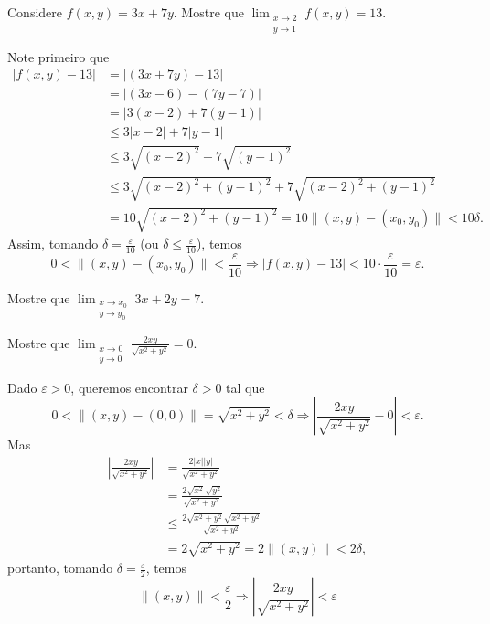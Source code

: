 \begin{example}
    Considere \(f(x,y) = 3x + 7y\). Mostre que \(\displaystyle\lim_{\substack{x\to 2 \\ y\to 1}} f(x,y) = 13.\)

    Note primeiro que
        \begin{align*}
            |f(x,y) - 13|
                & = |(3x+7y) - 13| \\
                & = |(3x - 6) - (7y - 7)| \\
                & = |3(x-2) + 7(y-1)| \\
                & \leq 3|x-2| + 7|y-1| \\
                & \leq 3\sqrt{(x-2)^2} + 7\sqrt{(y-1)^2} \\
                & \leq 3\sqrt{(x-2)^2 + (y-1)^2} + 7\sqrt{(x-2)^2 + (y-1)^2} \\
                & = 10\sqrt{(x-2)^2 + (y-1)^2} = 10 \|(x,y) - (x_0,y_0)\| < 10 \delta.
        \end{align*}
    Assim, tomando \(\delta = \frac{\varepsilon}{10}\) (ou \(\delta\leq\frac{\varepsilon}{10}\)), temos \[0 < \|(x,y) - (x_0,y_0)\| < \frac{\varepsilon}{10} \Rightarrow |f(x,y) - 13| < 10\cdot\frac{\varepsilon}{10} = \varepsilon.\]
\end{example}

\begin{exercise}
    Mostre que \(\displaystyle\lim_{\substack{x\to x_0 \\ y\to y_0}} 3x + 2y = 7\).
\end{exercise}

\begin{example}
    Mostre que \(\displaystyle\lim_{\substack{x\to 0 \\ y\to 0}} \frac{2xy}{\sqrt{x^2 + y^2}} = 0\).

    Dado \(\varepsilon>0\), queremos encontrar \(\delta>0\) tal que \[0 < \|(x,y) - (0,0)\| = \sqrt{x^2 + y^2} < \delta \Rightarrow \left|\frac{2xy}{\sqrt{x^2 + y^2}} - 0\right| < \varepsilon.\] Mas
        \begin{align*}
            \left|\frac{2xy}{\sqrt{x^2 + y^2}}\right|
                & = \frac{2|x||y|}{\sqrt{x^2 + y^2}} \\
                & = \frac{2\sqrt{x^2}\sqrt{y^2}}{\sqrt{x^2+y^2}} \\
                & \leq \frac{2\sqrt{x^2 + y^2}\sqrt{x^2 + y^2}}{\sqrt{x^2+y^2}} \\
                & = 2\sqrt{x^2+y^2} = 2\|(x,y)\| < 2\delta,
        \end{align*}
    portanto, tomando \(\delta = \frac{\varepsilon}{2}\), temos \[\|(x,y)\| < \frac{\varepsilon}{2} \Rightarrow \left|\frac{2xy}{\sqrt{x^2 + y ^2}}\right| < \varepsilon\]
\end{example}

